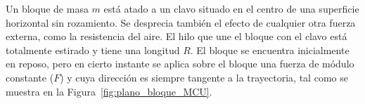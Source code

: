 \documentclass[addpoints]{exam}
\begin{document}
\begin{questions}
    \question \label{ej:bloque_plano_MCU} Un bloque de masa $m$ está atado a un clavo situado en el centro de una superficie horizontal sin rozamiento. Se desprecia también el efecto de cualquier otra fuerza externa, como la resistencia del aire. El hilo que une el bloque con el clavo está totalmente estirado y tiene una longitud $R$. El bloque se encuentra inicialmente en reposo, pero en cierto instante se aplica sobre el bloque una fuerza de módulo constante ($F$) y cuya dirección es siempre tangente a la trayectoria, tal como se muestra en la Figura~\ref{fig:plano_bloque_MCU}. \label{ej:plano_bloque_MCU}
    
    \begin{minipage}[c]{0.4\textwidth}
\end{minipage}
\end{questions}
\end{document}
